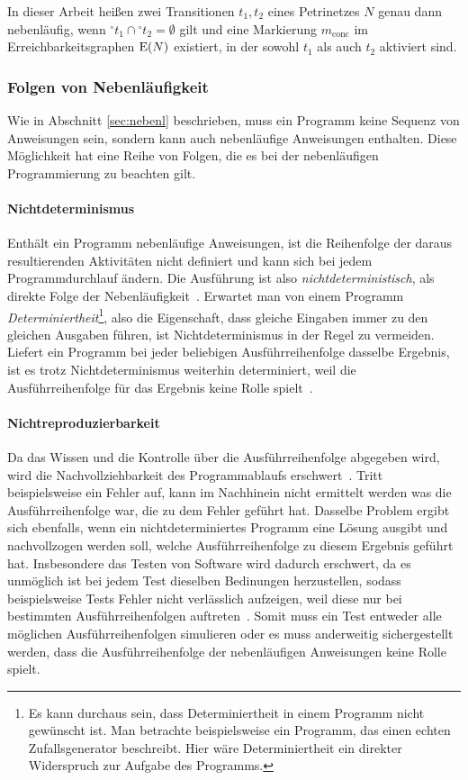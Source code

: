 In dieser Arbeit heißen zwei Transitionen $t_1, t_2$ eines Petrinetzes $N$ genau dann nebenläufig, wenn ${}^\circ t_1 \cap {}^\circ t_2 = \emptyset$ gilt und eine Markierung $m_\text{conc}$ im Erreichbarkeitsgraphen $\operatorname{E}(N)$ existiert, in der sowohl $t_1$ als auch $t_2$ aktiviert sind.

\subsubsection{Folgen von Nebenläufigkeit}\label{sec:nebenl-folgen}
Wie in Abschnitt \ref{sec:nebenl} beschrieben, muss ein Programm keine Sequenz von Anweisungen sein, sondern kann auch nebenläufige Anweisungen enthalten. Diese Möglichkeit hat eine Reihe von Folgen, die es bei der nebenläufigen Programmierung zu beachten gilt.
\paragraph{Nichtdeterminismus}
Enthält ein Programm nebenläufige Anweisungen, ist die Reihenfolge der daraus resultierenden Aktivitäten nicht definiert und kann sich bei jedem Programmdurchlauf ändern. Die Ausführung ist also \emph{nichtdeterministisch}, als direkte Folge der Nebenläufigkeit~\cite[S.~17~f.]{Herrtwich1989}. Erwartet man von einem Programm \emph{Determiniertheit}\footnote{Es kann durchaus sein, dass Determiniertheit in einem Programm nicht gewünscht ist. Man betrachte beispielsweise ein Programm, das einen echten Zufallsgenerator beschreibt. Hier wäre Determiniertheit ein direkter Widerspruch zur Aufgabe des Programms.}, also die Eigenschaft, dass gleiche Eingaben immer zu den gleichen Ausgaben führen, ist Nichtdeterminismus in der Regel zu vermeiden. Liefert ein Programm bei jeder beliebigen Ausführreihenfolge dasselbe Ergebnis, ist es trotz Nichtdeterminismus weiterhin determiniert, weil die Ausführreihenfolge für das Ergebnis keine Rolle spielt~\cite[S.~18~f.]{Herrtwich1989}. 
\paragraph{Nichtreproduzierbarkeit}
Da das Wissen und die Kontrolle über die Ausführreihenfolge abgegeben wird, wird die Nachvollziehbarkeit des Programmablaufs erschwert~\cite[S.~20]{Herrtwich1989}. Tritt beispielsweise ein Fehler auf, kann im Nachhinein nicht ermittelt werden was die Ausführreihenfolge war, die zu dem Fehler geführt hat. Dasselbe Problem ergibt sich ebenfalls, wenn ein nichtdeterminiertes Programm eine Lösung ausgibt und nachvollzogen werden soll, welche Ausführreihenfolge zu diesem Ergebnis geführt hat. Insbesondere das Testen von Software wird dadurch erschwert, da es unmöglich ist bei jedem Test dieselben Bedinungen herzustellen, sodass beispielsweise Tests Fehler nicht verlässlich aufzeigen, weil diese nur bei bestimmten Ausführreihenfolgen auftreten~\cite[S.~20]{Herrtwich1989}. Somit muss ein Test entweder alle möglichen Ausführreihenfolgen simulieren oder es muss anderweitig sichergestellt werden, dass die Ausführreihenfolge der nebenläufigen Anweisungen keine Rolle spielt.
